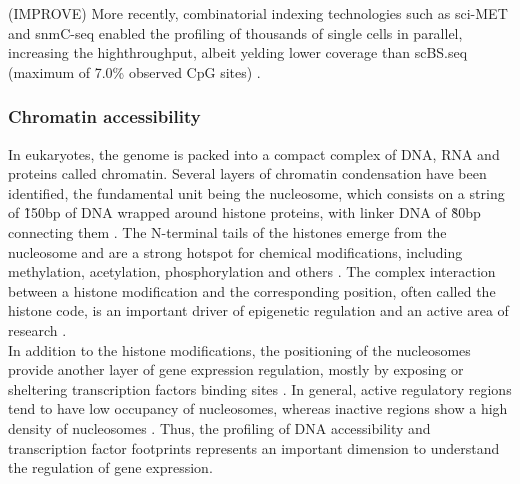 (IMPROVE) More recently, combinatorial indexing technologies such as sci-MET \cite{Mulqueen2018} and snmC-seq \cite{Luo2018} enabled the profiling of thousands of single cells in parallel, increasing the highthroughput, albeit yelding lower coverage than scBS.seq (maximum of 7.0\% observed CpG sites) \cite{Mulqueen2018}.

\subsubsection{Chromatin accessibility} \label{section:chromatin_accessibility}
In eukaryotes, the genome is packed into a compact complex of DNA, RNA and proteins called chromatin. Several layers of chromatin condensation have been identified, the fundamental unit being the nucleosome, which consists on a string of \~ 150bp of DNA wrapped around histone proteins, with linker DNA of \~ 80bp connecting them \cite{Klemm2019,Tsompana2014}. The N-terminal tails of the histones emerge from the nucleosome and are a strong hotspot for chemical modifications, including methylation, acetylation, phosphorylation and others \cite{Bannister2011}. The complex interaction between a histone modification and the corresponding position, often called the histone code, is an important driver of epigenetic regulation and an active area of research \cite{Zhao2015}. \\
In addition to the histone modifications, the positioning of the nucleosomes provide another layer of gene expression regulation, mostly by exposing or sheltering transcription factors binding sites \cite{Jiang2009}. In general, active regulatory regions tend to have low occupancy of nucleosomes, whereas inactive regions show a high density of nucleosomes \cite{Struhl2013}. Thus, the profiling of DNA accessibility and transcription factor footprints represents an important dimension to understand the regulation of gene expression.\\

